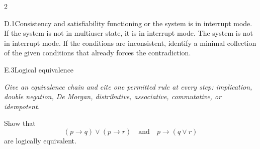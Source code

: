 \documentclass[9pt]{extarticle}
\begin{document}
\begin{multicols}{2}
\begin{CoreProblem}{D.1}{Consistency and satisfiability}
functioning or the system is in interrupt mode. If the system is not in
multiuser state, it is in interrupt mode. The system is not in interrupt mode.
If the conditions are inconsistent, identify a minimal collection of the given
conditions that already forces the contradiction.
\end{CoreProblem}
\begin{CoreProblem}{E.3}{Logical equivalence}
{\scriptsize\textit{Give an equivalence chain and cite one permitted rule at every step: implication, double negation, De Morgan, distributive, associative, commutative, or idempotent.}\par}
Show that
\[
  (p\to q)\lor(p\to r)
  \quad\text{and}\quad
  p\to(q\lor r)
\]
are logically equivalent.
\end{CoreProblem}
\end{multicols}
\CoreWorkArea
\FormBreak
{}
\end{document}
